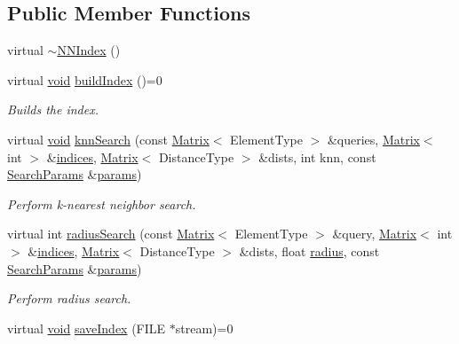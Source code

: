 \subsection*{Public Member Functions}
\begin{DoxyCompactItemize}
\item 
virtual \hyperlink{classcvflann_1_1NNIndex_af391eb1a19b60e7d8e08c26c54c46baa}{$\sim$\-N\-N\-Index} ()
\item 
virtual \hyperlink{legacy_8hpp_a8bb47f092d473522721002c86c13b94e}{void} \hyperlink{classcvflann_1_1NNIndex_aaa8811509bb2f30e91570cefe4dc71e2}{build\-Index} ()=0
\begin{DoxyCompactList}\small\item\em Builds the index. \end{DoxyCompactList}\item 
virtual \hyperlink{legacy_8hpp_a8bb47f092d473522721002c86c13b94e}{void} \hyperlink{classcvflann_1_1NNIndex_a8cf5c942430421358bf67d93565942db}{knn\-Search} (const \hyperlink{classcvflann_1_1Matrix}{Matrix}$<$ Element\-Type $>$ \&queries, \hyperlink{classcvflann_1_1Matrix}{Matrix}$<$ int $>$ \&\hyperlink{legacy_8hpp_a3e3b9b48bcbc7f460efbcfe4399ad24a}{indices}, \hyperlink{classcvflann_1_1Matrix}{Matrix}$<$ Distance\-Type $>$ \&dists, int knn, const \hyperlink{structcvflann_1_1SearchParams}{Search\-Params} \&\hyperlink{compat_8hpp_a0480a03ecc41b20cde376602531d9270}{params})
\begin{DoxyCompactList}\small\item\em Perform k-\/nearest neighbor search. \end{DoxyCompactList}\item 
virtual int \hyperlink{classcvflann_1_1NNIndex_a142da9423596dd59766d1dcbcac433e9}{radius\-Search} (const \hyperlink{classcvflann_1_1Matrix}{Matrix}$<$ Element\-Type $>$ \&query, \hyperlink{classcvflann_1_1Matrix}{Matrix}$<$ int $>$ \&\hyperlink{legacy_8hpp_a3e3b9b48bcbc7f460efbcfe4399ad24a}{indices}, \hyperlink{classcvflann_1_1Matrix}{Matrix}$<$ Distance\-Type $>$ \&dists, float \hyperlink{imgproc__c_8h_a32526d67e420fc7060ade2efeaeda976}{radius}, const \hyperlink{structcvflann_1_1SearchParams}{Search\-Params} \&\hyperlink{compat_8hpp_a0480a03ecc41b20cde376602531d9270}{params})
\begin{DoxyCompactList}\small\item\em Perform radius search. \end{DoxyCompactList}\item 
virtual \hyperlink{legacy_8hpp_a8bb47f092d473522721002c86c13b94e}{void} \hyperlink{classcvflann_1_1NNIndex_aad5c63116e3dbeccc96de7c70f0a8db7}{save\-Index} (F\-I\-L\-E $\ast$stream)=0

\end{DoxyCompactItemize}
